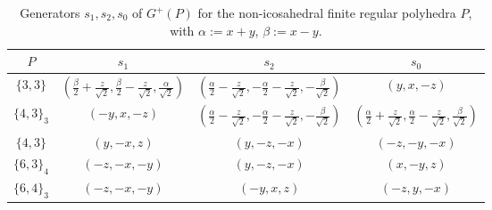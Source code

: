 \documentclass[12pt]{article}
\theoremstyle{definition}\newtheorem{definition}{Definition}[section]
\begin{document}
\begin{table}
\begin{center}
\begin{tabular}{ |c|c|c|c| } 
 \hline
 \rule{0pt}{2.25ex} $P$ & $s_1$ & $s_2$ & $s_0$  \\ [0.25ex]
 \hline
 \rule{0pt}{2.25ex} $\{3,3\}$ & $(\frac{\beta}{2}+\frac{z}{\sqrt{2}},\frac{\beta}{2}-\frac{z}{\sqrt{2}},\frac{\alpha}{\sqrt{2}})$ & $(\frac{\alpha}{2}-\frac{z}{\sqrt{2}},-\frac{\alpha}{2}-\frac{z}{\sqrt{2}},-\frac{\beta}{\sqrt{2}})$ & $(y,x,-z)$  \\ [0.25ex]
 \hline
 \rule{0pt}{2.25ex} $\{4,3\}_3$ & $(-y,x,-z)$ & $(\frac{\alpha}{2}-\frac{z}{\sqrt{2}},-\frac{\alpha}{2}-\frac{z}{\sqrt{2}},-\frac{\beta}{\sqrt{2}})$ & $(\frac{\alpha}{2}+\frac{z}{\sqrt{2}},\frac{\alpha}{2}-\frac{z}{\sqrt{2}},\frac{\beta}{\sqrt{2}})$  \\ [0.25ex]
 \hline
 \rule{0pt}{2.25ex} $\{4,3\}$ & $(y,-x,z)$ & $(y,-z,-x)$ & $(-z,-y,-x)$  \\ [0.25ex]
 \hline
 \rule{0pt}{2.25ex} $\{6,3\}_4$ & $(-z,-x,-y)$ & $(y,-z,-x)$ & $(x,-y,z)$  \\ [0.25ex]
 \hline
 \rule{0pt}{2.25ex} $\{6,4\}_3$ & $(-z,-x,-y)$ & $(-y,x,z)$ & $(-z,y,-x)$  \\ [0.25ex]
 \hline
\end{tabular}
\end{center}
\caption{Generators $s_1,s_2, s_0$ of $G^+(P)$ for the non-icosahedral finite regular polyhedra $P$, with $\alpha:=x+y$, $\beta:=x-y$.}
\label{gplusfinite1}
\end{table}
\end{document}
